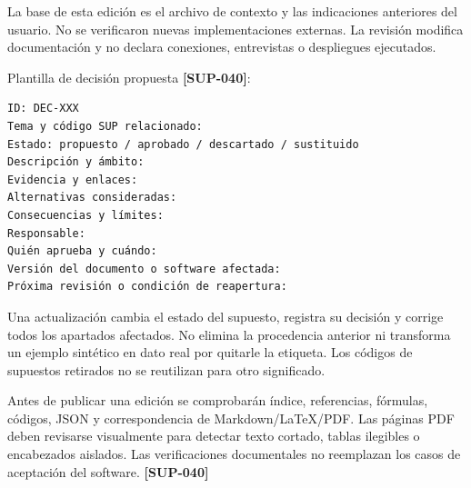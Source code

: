 \documentclass[10pt,a4paper]{article}
\begin{document}
La base de esta edición es el archivo de contexto y las indicaciones anteriores del usuario. No se verificaron nuevas implementaciones externas. La revisión modifica documentación y no declara conexiones, entrevistas o despliegues ejecutados.


Plantilla de decisión propuesta \textbf{[SUP-040]}:


\begin{minipage}{\linewidth}
\begin{lstlisting}
ID: DEC-XXX
Tema y código SUP relacionado:
Estado: propuesto / aprobado / descartado / sustituido
Descripción y ámbito:
Evidencia y enlaces:
Alternativas consideradas:
Consecuencias y límites:
Responsable:
Quién aprueba y cuándo:
Versión del documento o software afectada:
Próxima revisión o condición de reapertura:
\end{lstlisting}
\end{minipage}\par

Una actualización cambia el estado del supuesto, registra su decisión y corrige todos los apartados afectados. No elimina la procedencia anterior ni transforma un ejemplo sintético en dato real por quitarle la etiqueta. Los códigos de supuestos retirados no se reutilizan para otro significado.


Antes de publicar una edición se comprobarán índice, referencias, fórmulas, códigos, JSON y correspondencia de Markdown/\allowbreak{}LaTeX/\allowbreak{}PDF. Las páginas PDF deben revisarse visualmente para detectar texto cortado, tablas ilegibles o encabezados aislados. Las verificaciones documentales no reemplazan los casos de aceptación del software. \textbf{[SUP-040]}
\end{document}
